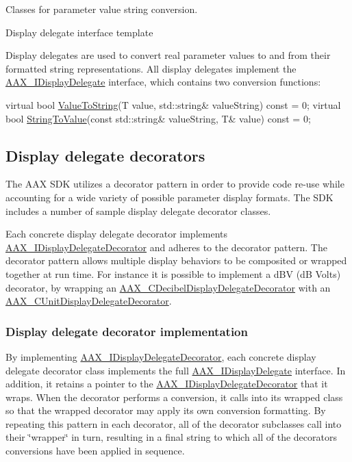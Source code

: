 Classes for parameter value string conversion. 

Display delegate interface template

Display delegates are used to convert real parameter values to and from their formatted string representations. All display delegates implement the \hyperlink{a00092}{A\+A\+X\+\_\+\+I\+Display\+Delegate} interface, which contains two conversion functions\+:


\begin{DoxyCode}
\textcolor{keyword}{virtual} \textcolor{keywordtype}{bool}    \hyperlink{a00092_a7fd1e2f55055c817937bbfa66b73b2fd}{ValueToString}(T value, std::string& valueString) \textcolor{keyword}{const} = 0;
\textcolor{keyword}{virtual} \textcolor{keywordtype}{bool}    \hyperlink{a00092_aed5224775c9f733f091afddfba057d5e}{StringToValue}(\textcolor{keyword}{const} std::string& valueString, T& value) \textcolor{keyword}{const} = 0;     
\end{DoxyCode}
\hypertarget{a00346_displaydelegates_decorators}{}\subsection{Display delegate decorators}\label{a00346_displaydelegates_decorators}
The A\+A\+X S\+D\+K utilizes a decorator pattern in order to provide code re-\/use while accounting for a wide variety of possible parameter display formats. The S\+D\+K includes a number of sample display delegate decorator classes.

Each concrete display delegate decorator implements \hyperlink{a00094}{A\+A\+X\+\_\+\+I\+Display\+Delegate\+Decorator} and adheres to the decorator pattern. The decorator pattern allows multiple display behaviors to be composited or wrapped together at run time. For instance it is possible to implement a d\+B\+V (d\+B Volts) decorator, by wrapping an \hyperlink{a00015}{A\+A\+X\+\_\+\+C\+Decibel\+Display\+Delegate\+Decorator} with an \hyperlink{a00045}{A\+A\+X\+\_\+\+C\+Unit\+Display\+Delegate\+Decorator}.\hypertarget{a00346_displaydelegates_decorators_implementation}{}\subsubsection{Display delegate decorator implementation}\label{a00346_displaydelegates_decorators_implementation}
By implementing \hyperlink{a00094}{A\+A\+X\+\_\+\+I\+Display\+Delegate\+Decorator}, each concrete display delegate decorator class implements the full \hyperlink{a00092}{A\+A\+X\+\_\+\+I\+Display\+Delegate} interface. In addition, it retains a pointer to the \hyperlink{a00094}{A\+A\+X\+\_\+\+I\+Display\+Delegate\+Decorator} that it wraps. When the decorator performs a conversion, it calls into its wrapped class so that the wrapped decorator may apply its own conversion formatting. By repeating this pattern in each decorator, all of the decorator subclasses call into their \char`\"{}wrapper\char`\"{} in turn, resulting in a final string to which all of the decorators\textquotesingle{} conversions have been applied in sequence.

